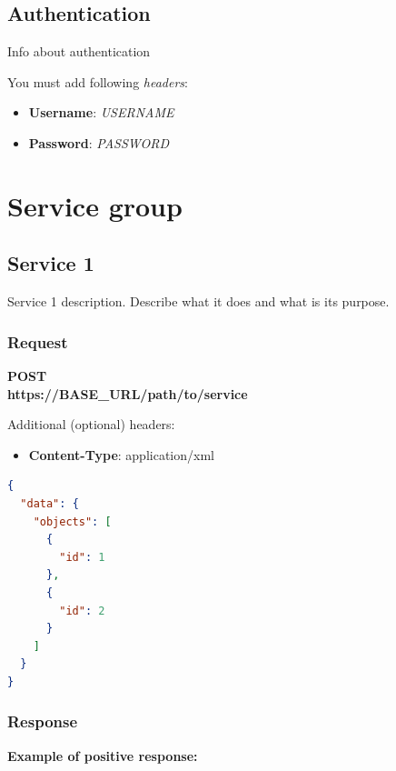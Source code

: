 \documentclass{scrreprt}
\begin{document}
\section{Authentication}

Info about authentication

You must add following \emph{headers}:

\begin{itemize}
    \item \textbf{Username}: \textit{USERNAME}
    \item \textbf{Password}: \textit{PASSWORD}
\end{itemize}


\chapter{Service group}


\section{Service 1}\label{sec:sdi_send}

Service 1 description.
Describe what it does and what is its purpose.

\subsection{Request}

\textbf{POST \\ https://BASE_URL/path/to/service}

\vspace{.5cm}

Additional (optional) headers:
\begin{itemize}
    \item \textbf{Content-Type}: application/xml
\end{itemize}

\begin{lstlisting}[language=json,firstnumber=1,caption=Payload]
{
  "data": {
    "objects": [
      {
        "id": 1
      },
      {
        "id": 2
      }
    ]
  }
}
\end{lstlisting}

\subsection{Response}

\textbf{Example of positive response:}
\end{document}
